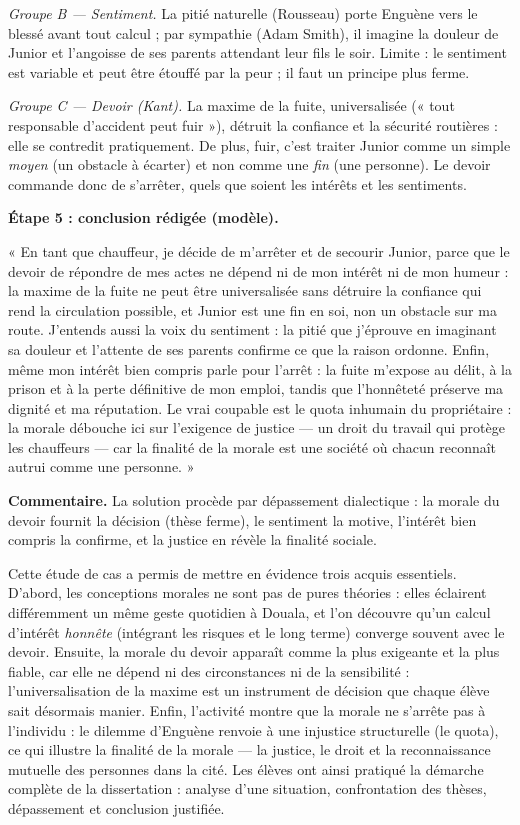 \documentclass[11pt]{article}
\newcounter{popsec}
\newcounter{popsub}
\newcommand{\courssub}[1]{%
  \stepcounter{popsub}%
  \par\vspace{9pt}\noindent{\popxbold\fontsize{11.5}{13}\selectfont\color{popink}{\color{poporange}\thepopsec.\thepopsub}\hspace{6pt}#1}\par\nopagebreak\vspace{4pt}
}
\begin{document}
\begin{exoresolu}
\emph{Groupe B — Sentiment.} La pitié naturelle (Rousseau) porte Enguène vers le blessé avant tout calcul ; par sympathie (Adam Smith), il imagine la douleur de Junior et l'angoisse de ses parents attendant leur fils le soir. Limite : le sentiment est variable et peut être étouffé par la peur ; il faut un principe plus ferme.

\emph{Groupe C — Devoir (Kant).} La maxime de la fuite, universalisée (« tout responsable d'accident peut fuir »), détruit la confiance et la sécurité routières : elle se contredit pratiquement. De plus, fuir, c'est traiter Junior comme un simple \emph{moyen} (un obstacle à écarter) et non comme une \emph{fin} (une personne). Le devoir commande donc de s'arrêter, quels que soient les intérêts et les sentiments.

\textbf{Étape 5 : conclusion rédigée (modèle).}

« En tant que chauffeur, je décide de m'arrêter et de secourir Junior, parce que le devoir de répondre de mes actes ne dépend ni de mon intérêt ni de mon humeur : la maxime de la fuite ne peut être universalisée sans détruire la confiance qui rend la circulation possible, et Junior est une fin en soi, non un obstacle sur ma route. J'entends aussi la voix du sentiment : la pitié que j'éprouve en imaginant sa douleur et l'attente de ses parents confirme ce que la raison ordonne. Enfin, même mon intérêt bien compris parle pour l'arrêt : la fuite m'expose au délit, à la prison et à la perte définitive de mon emploi, tandis que l'honnêteté préserve ma dignité et ma réputation. Le vrai coupable est le quota inhumain du propriétaire : la morale débouche ici sur l'exigence de justice — un droit du travail qui protège les chauffeurs — car la finalité de la morale est une société où chacun reconnaît autrui comme une personne. »

\textbf{Commentaire.} La solution procède par dépassement dialectique : la morale du devoir fournit la décision (thèse ferme), le sentiment la motive, l'intérêt bien compris la confirme, et la justice en révèle la finalité sociale.
\end{exoresolu}

\courssub{Bilan de l'activité}

Cette étude de cas a permis de mettre en évidence trois acquis essentiels. D'abord, les conceptions morales ne sont pas de pures théories : elles éclairent différemment un même geste quotidien à Douala, et l'on découvre qu'un calcul d'intérêt \emph{honnête} (intégrant les risques et le long terme) converge souvent avec le devoir. Ensuite, la morale du devoir apparaît comme la plus exigeante et la plus fiable, car elle ne dépend ni des circonstances ni de la sensibilité : l'universalisation de la maxime est un instrument de décision que chaque élève sait désormais manier. Enfin, l'activité montre que la morale ne s'arrête pas à l'individu : le dilemme d'Enguène renvoie à une injustice structurelle (le quota), ce qui illustre la finalité de la morale — la justice, le droit et la reconnaissance mutuelle des personnes dans la cité. Les élèves ont ainsi pratiqué la démarche complète de la dissertation : analyse d'une situation, confrontation des thèses, dépassement et conclusion justifiée.
\end{document}

